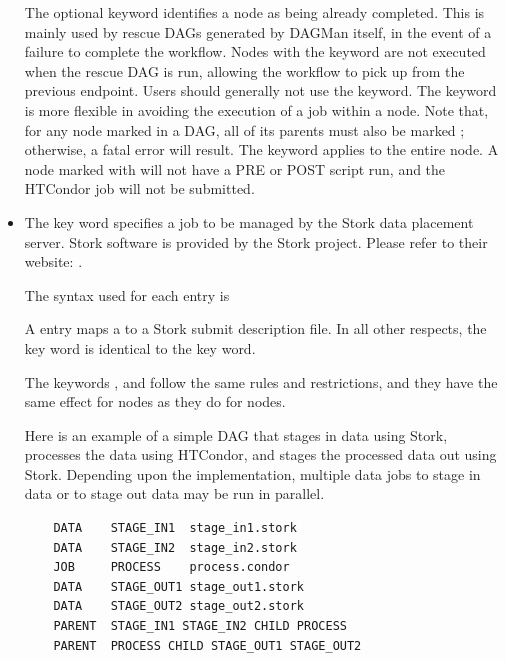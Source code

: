 \begin{itemize}
The optional  keyword identifies a node as being already
completed.
This is mainly used by rescue DAGs generated by DAGMan itself,
in the event of a failure to complete the workflow.
Nodes with the  keyword are not executed when the rescue DAG is run,
allowing the workflow to pick up from the previous endpoint.  Users
should generally not use the  keyword.
The  keyword is more flexible in avoiding
the execution of a job within a node.
Note that, for any node marked  in a DAG, all of
its parents must also be marked ; 
otherwise, a fatal error will result.
The  keyword applies to the entire node.
A node marked with  will not have a PRE or POST script run,
and the HTCondor job will not be submitted.

\label{dagman:DATA}
\item {}

The  key word specifies a job to be managed by the Stork data
placement server.  
Stork software is provided by the Stork project.
Please refer to their website: 
.

The syntax used for each  entry is

  
  

A  entry maps a  to a Stork submit description file.
In all other respects, the  key word is identical to the
 key word.

The keywords ,  and  
follow the same rules and restrictions, and they have the same effect
for  nodes as they do for  nodes.

Here is an example of a simple DAG that stages in data using Stork,
processes the data using HTCondor, 
and stages the processed data out using Stork.
Depending upon the implementation, multiple data jobs to stage in data
or to stage out data
may be run in parallel.

\footnotesize
\begin{verbatim}
    DATA    STAGE_IN1  stage_in1.stork
    DATA    STAGE_IN2  stage_in2.stork
    JOB     PROCESS    process.condor 
    DATA    STAGE_OUT1 stage_out1.stork
    DATA    STAGE_OUT2 stage_out2.stork
    PARENT  STAGE_IN1 STAGE_IN2 CHILD PROCESS
    PARENT  PROCESS CHILD STAGE_OUT1 STAGE_OUT2
\end{verbatim}
\normalsize


\end{itemize}
